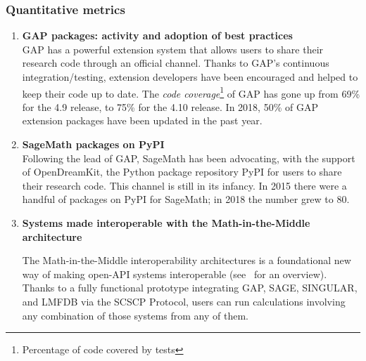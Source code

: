 \subsubsection{Quantitative metrics}

\begin{enumerate}
\item \textbf{GAP packages: activity and adoption of best practices}\\
  GAP has a powerful extension system that allows users to share their
  research code through an official channel. Thanks to GAP's
  continuous integration/testing, extension developers have been
  encouraged and helped to keep their code up to date. The \emph{code
    coverage}\footnote{Percentage of code covered by tests} of GAP has
  gone up from 69\% for the 4.9 release, to 75\% for the 4.10 release.
  In 2018, 50\% of GAP extension packages have been updated in the
  past year.
\item \textbf{SageMath packages on PyPI}\\
  Following the lead of GAP, SageMath has been advocating, with the
  support of OpenDreamKit, the Python package repository PyPI for
  users to share their research code. This channel is still in its
  infancy. In 2015 there were a handful of packages on PyPI for
  SageMath; in 2018 the number grew to 80.

\item \textbf{Systems made interoperable with the Math-in-the-Middle architecture}\\


  The Math-in-the-Middle interoperability architectures is a
  foundational new way of making open-API systems interoperable
  (see~\cite{ODK-D6.5} for an overview). Thanks to a fully functional
  prototype integrating GAP, SAGE, SINGULAR, and LMFDB via the SCSCP
  Protocol, users can run calculations involving any combination of
  those systems from any of them.


\end{enumerate}
